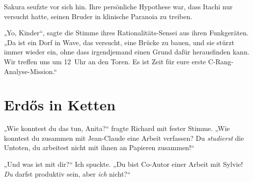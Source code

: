 Sakura seufzte vor sich hin. Ihre persönliche Hypothese war, dass Itachi nur versucht hatte, seinen Bruder in klinische Paranoia zu treiben.

„Yo, Kinder“, sagte die Stimme ihres Rationalitäts-Sensei aus ihren Funkgeräten.
„Da ist ein Dorf in Wave, das versucht, eine Brücke zu bauen, und sie stürzt immer wieder ein, ohne dass irgendjemand einen Grund dafür herausfinden kann. Wir treffen uns um 12~Uhr an den Toren. Es ist Zeit für eure erste C-Rang-Analyse-Mission.“

\section{Erdős in Ketten}

„Wie konntest du das tun, Anita?“ fragte Richard mit fester Stimme.
„Wie konntest du zusammen mit Jean-Claude eine Arbeit verfassen? Du \emph{studierst} die Untoten, du arbeitest nicht mit ihnen an Papieren zusammen!“

„Und was ist mit dir?“ Ich spuckte.
„Du bist Co-Autor einer Arbeit mit Sylvie! \emph{Du} darfst produktiv sein, aber \emph{ich} nicht?“

